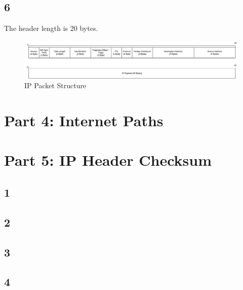 \documentclass{article}
\begin{document}
    \subsection*{6}
    The header length is 20 bytes.
    \begin{figure}[htbp]
        \centering
        \includegraphics[width=\textwidth]{images/part3.drawio.png}
        \caption{IP Packet Structure}
    \end{figure}
    \section*{Part 4: Internet Paths}
    \section*{Part 5: IP Header Checksum}
    \subsection*{1}
    \subsection*{2}
    \subsection*{3}
    \subsection*{4}
\end{document}
